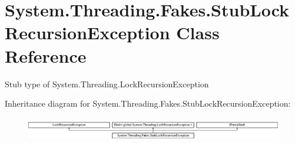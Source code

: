 \hypertarget{class_system_1_1_threading_1_1_fakes_1_1_stub_lock_recursion_exception}{\section{System.\-Threading.\-Fakes.\-Stub\-Lock\-Recursion\-Exception Class Reference}
\label{class_system_1_1_threading_1_1_fakes_1_1_stub_lock_recursion_exception}
}


Stub type of System.\-Threading.\-Lock\-Recursion\-Exception 


Inheritance diagram for System.\-Threading.\-Fakes.\-Stub\-Lock\-Recursion\-Exception\-:\begin{figure}[H]
\begin{center}
\leavevmode
\includegraphics[height=1.054614cm]{class_system_1_1_threading_1_1_fakes_1_1_stub_lock_recursion_exception}
\end{center}
\end{figure}
